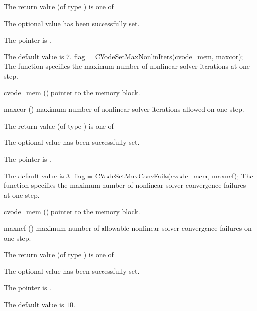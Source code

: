 {
  The return value  (of type ) is one of
  \begin{args}
  \item[\Id{CV\_SUCCESS}] 
    The optional value has been successfully set.
  \item[\Id{CV\_MEM\_NULL}]
    The  pointer is .
  \end{args}
}
{
  The default value is $7$.
}
{
flag = CVodeSetMaxNonlinIters(cvode\_mem, maxcor);
}
{
  The function  specifies the maximum
  number of nonlinear solver iterations at one step.
}
{
  \begin{args}
  \item[cvode\_mem] ()
    pointer to the {\cvode} memory block.
  \item[maxcor] ()
    maximum number of nonlinear solver iterations allowed on one step.
  \end{args}
}
{
  The return value  (of type ) is one of
  \begin{args}
  \item[\Id{CV\_SUCCESS}] 
    The optional value has been successfully set.
  \item[\Id{CV\_MEM\_NULL}]
    The  pointer is .
  \end{args}
}
{
  The default value is $3$.
}
{
flag = CVodeSetMaxConvFails(cvode\_mem, maxncf);
}
{
  The function  specifies the
  maximum number of nonlinear solver convergence failures at one step.
}
{
  \begin{args}
  \item[cvode\_mem] ()
    pointer to the {\cvode} memory block.
  \item[maxncf] ()
    maximum number of allowable nonlinear solver convergence failures
    on one step.
  \end{args}
}
{
  The return value  (of type ) is one of
  \begin{args}
  \item[\Id{CV\_SUCCESS}] 
    The optional value has been successfully set.
  \item[\Id{CV\_MEM\_NULL}]
    The  pointer is .
  \end{args}
}
{
  The default value is $10$.
}

